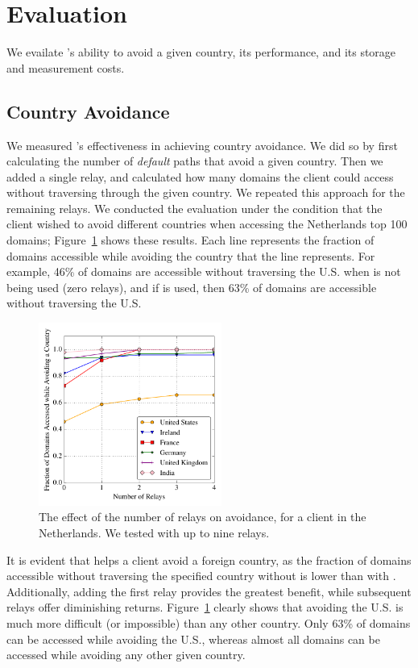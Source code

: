 \section{Evaluation}

We evailate \system{}'s ability to avoid a given country, its performance,
and its storage and measurement costs.

\subsection{Country Avoidance}

We measured \system{}'s effectiveness in achieving country avoidance.  We did so by first 
calculating the number of {\it default} paths that avoid a given country.  Then 
we added a single relay, and calculated how many domains the client could 
access without traversing through the given country.  We repeated this approach for 
the remaining relays.  We conducted the evaluation under the condition that 
the client wished to avoid different countries when accessing the Netherlands top 
100 domains; Figure~\ref{fig:avoidance_eval} shows these results.  Each 
line represents the fraction of domains accessible while avoiding the country that 
the line represents.  For example, 46\% of domains are accessible without traversing 
the U.S. when \system{} is not being used (zero relays), and if \system{} is 
used, then 63\% of domains are accessible without traversing the U.S.

\begin{figure}[t!]
\tiny
\centering
\includegraphics[width=.5\textwidth,height=6cm]{avoidance_n_relays}
\caption{The effect of the number of relays on avoidance, for a client
  in the Netherlands. We tested \system{} with up to nine relays.}
\label{fig:avoidance_eval}
\end{figure}

It is evident that \system{} helps a client avoid a foreign country,
as the fraction of domains accessible without traversing the specified
country without \system{} is lower than with \system{}.  Additionally,
adding the first relay provides the greatest benefit, while subsequent
relays offer diminishing returns.  Figure~\ref{fig:avoidance_eval}
clearly shows that avoiding the U.S. is much more difficult (or
impossible) than any other country.  Only 63\% of domains can be
accessed while avoiding the U.S., whereas almost all domains can be
accessed while avoiding any other given country.

